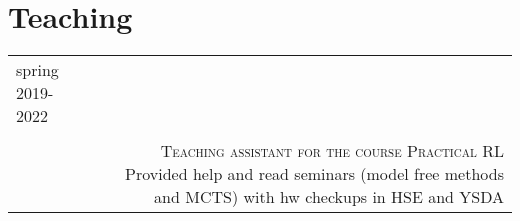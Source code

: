 \section*{Teaching}
\vspace{-0.5em}
\begin{tabular}{@{}L!{\VRule}R}
    spring 2019-2022                                                                                                                                         \\ {} \\ &
    {\textsc{Teaching assistant for the course Practical RL}} Provided help and read seminars (model free methods and MCTS) with hw checkups in HSE and YSDA \\
\end{tabular}
